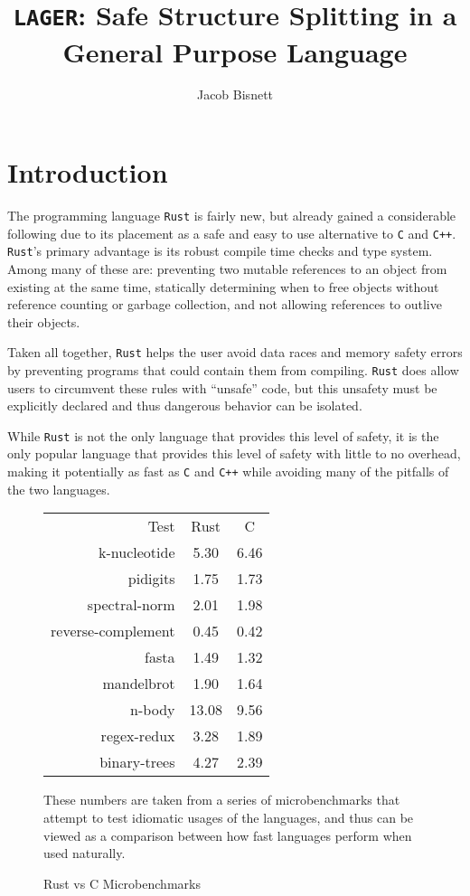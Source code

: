 \documentclass[12pt,oneside]{book}
\newcommand{\rustname}{{\texttt{Rust}}}
\def \rust {\rustname{}\xspace}
\newcommand{\cname}{{\texttt{C}}}
\def \c {\cname{}\xspace}
\newcommand{\cppname}{{\texttt{C++}}}
\def \cpp {\cppname{}\xspace}
\newcommand{\projectname}{{\texttt{LAGER}}}
\def \name{\projectname\xspace}
\begin{document}
\title{\name: Safe Structure Splitting in a General Purpose Language}
\author{Jacob Bisnett}
\maketitle
\pagestyle{fancy}
\chapter{Introduction}
\doublespacing
\label{sec:intro}


The programming language \rust is fairly new, but already gained a considerable
following due to its placement as a safe and easy to use alternative to \c and
\cpp. \rust's primary advantage is its robust compile time checks and type
system. Among many of these are:
preventing two mutable references to an object from existing at the same time, 
statically determining when to free objects without reference counting or
garbage collection,
and not allowing references to outlive their objects.

Taken all together, \rust helps the user avoid data races and memory safety
errors by preventing programs that could contain them from compiling.
\rust does allow users to circumvent these rules with ``unsafe'' code,
but this unsafety must be explicitly declared and thus dangerous behavior can be
isolated.

While \rust is not the only language that provides this level of safety, it is
the only popular language that provides this level of safety with little to no overhead,
making it potentially as fast as \c and \cpp while avoiding many of the
pitfalls of the two languages.

\begin{figure}
  \centering
\begin{tabular}{r|c|c}
  Test&Rust&C\\
  k-nucleotide&5.30&6.46\\
  pidigits&1.75&1.73\\
  spectral-norm&2.01&1.98\\
  reverse-complement&0.45&0.42\\
  fasta&1.49&1.32\\
  mandelbrot&1.90&1.64\\
  n-body&13.08&9.56\\
  regex-redux&3.28&1.89\\
  binary-trees&4.27&2.39\\
\end{tabular}

  These numbers are taken from a series of microbenchmarks that attempt to 
  test idiomatic usages of the languages, and thus can be viewed as a comparison
  between how fast languages perform when used naturally.\cite{bench}
  \caption{Rust vs C Microbenchmarks}
  \label{fig:bench}
\end{figure}
\end{document}
